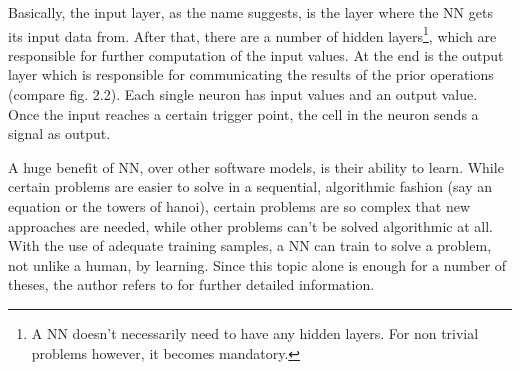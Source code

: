 Basically, the input layer, as the name suggests, is the layer where the NN gets its input data from. After that, there are a number of hidden layers\footnote{A NN doesn't necessarily need to have any hidden layers. For non trivial problems however, it becomes mandatory.}, which are responsible for further computation of the input values. At the end is the output layer which is responsible for communicating the results of the prior operations (compare fig. 2.2). Each single neuron has input values and an output value. Once the input reaches a certain trigger point, the cell in the neuron sends a signal as output. 

A huge benefit of NN, over other software models, is their ability to learn. While certain problems are easier to solve in a sequential, algorithmic fashion (say an equation or the towers of hanoi), certain problems are so complex that new approaches are needed, while other problems can't be solved algorithmic at all. With the use of adequate training samples, a NN can train to solve a problem, not unlike a human, by learning. Since this topic alone is enough for a number of theses, the author refers to \cite{Kriesel07} for further detailed information.
